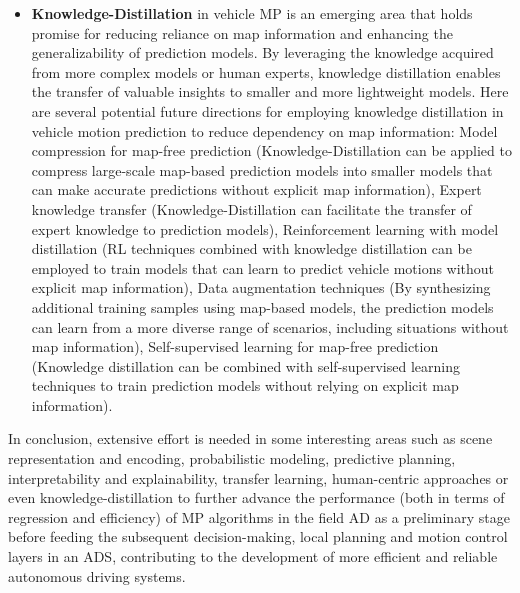 \begin{itemize}
	\item \textbf{Knowledge-Distillation} in vehicle \ac{MP} \cite{schmidt2023exploring} \cite{li2022driver} is an emerging area that holds promise for reducing reliance on map information and enhancing the generalizability of prediction models. By leveraging the knowledge acquired from more complex models or human experts, knowledge distillation enables the transfer of valuable insights to smaller and more lightweight models. Here are several potential future directions for employing knowledge distillation in vehicle motion prediction to reduce dependency on map information: Model compression for map-free prediction (Knowledge-Distillation can be applied to compress large-scale map-based prediction models into smaller models that can make accurate predictions without explicit map information), Expert knowledge transfer (Knowledge-Distillation can facilitate the transfer of expert knowledge to prediction models), Reinforcement learning with model distillation (\ac{RL} techniques combined with knowledge distillation can be employed to train models that can learn to predict vehicle motions without explicit map information), Data augmentation techniques (By synthesizing additional training samples using map-based models, the prediction models can learn from a more diverse range of scenarios, including situations without map information), Self-supervised learning for map-free prediction (Knowledge distillation can be combined with self-supervised learning techniques to train prediction models without relying on explicit map information).
	
\end{itemize}

In conclusion, extensive effort is needed in some interesting areas such as scene representation and encoding, probabilistic modeling, predictive planning, interpretability and explainability, transfer learning, human-centric approaches or even knowledge-distillation to further advance the performance (both in terms of regression and efficiency) of \ac{MP} algorithms in the field \ac{AD} as a preliminary stage before feeding the subsequent decision-making, local planning and motion control layers in an \ac{ADS}, contributing to the development of more efficient and reliable autonomous driving systems.


